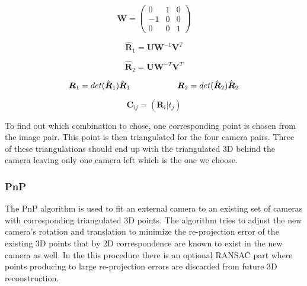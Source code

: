 \begin{equation}
\boldsymbol{W} = 	\begin{pmatrix}
					0  & 1 & 0 \\
					-1 & 0 & 0 \\
					0  & 0 & 1
					\end{pmatrix}
\end{equation}

\begin{equation}
\hat{\boldsymbol{R}}_1 = \boldsymbol{U W }^{-1} \boldsymbol{V}^T
\end{equation}

\begin{equation}
\hat{\boldsymbol{R}}_2 = \boldsymbol{U W }^{-T} \boldsymbol{V}^T
\end{equation}

\begin{equation}
\boldsymbol{R}_1 = det(\hat{\boldsymbol{R}}_1) \hat{\boldsymbol{R}}_1 
\hspace{2 cm}
\boldsymbol{R}_2 = det(\hat{\boldsymbol{R}}_2) \hat{\boldsymbol{R}}_2
\end{equation}

\begin{equation}
\boldsymbol{C}_{ij} = (\boldsymbol{R}_i | t_j)
\end{equation}

To find out which combination to chose, one corresponding point is chosen from the image pair. This point is then triangulated for the four camera pairs. Three of these triangulations should end up with the triangulated 3D behind the camera leaving only one camera left which is the one we choose. 

\subsubsection{PnP}
The PnP algorithm is used to fit an external camera to an existing set of cameras with corresponding triangulated 3D points. The algorithm tries to adjust the new camera's rotation and translation to minimize the re-projection error of the existing 3D points that by 2D correspondence are known to exist in the new camera as well. In the this procedure there is an optional RANSAC part where points producing to large re-projection errors are discarded from future 3D reconstruction. 

